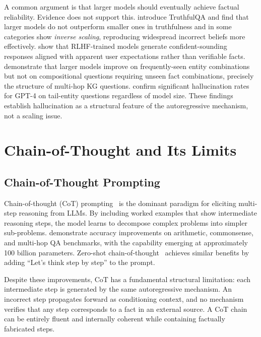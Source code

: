 A common argument is that larger models should eventually achieve factual reliability. Evidence does not support this. \citet{lin2022truthfulqa} introduce TruthfulQA and find that larger models do not outperform smaller ones in truthfulness and in some categories show \textit{inverse scaling}, reproducing widespread incorrect beliefs more effectively. \citet{perez2022sycophancy} show that RLHF-trained models generate confident-sounding responses aligned with apparent user expectations rather than verifiable facts. \citet{kandpal2023large} demonstrate that larger models improve on frequently-seen entity combinations but not on compositional questions requiring unseen fact combinations, precisely the structure of multi-hop KG questions. \citet{mallen2023not} confirm significant hallucination rates for GPT-4 on tail-entity questions regardless of model size. These findings establish hallucination as a structural feature of the autoregressive mechanism, not a scaling issue.

\section{Chain-of-Thought and Its Limits}
\label{sec:cot}

\subsection{Chain-of-Thought Prompting}

Chain-of-thought (CoT) prompting~\citep{wei2022cot} is the dominant paradigm for eliciting multi-step reasoning from LLMs. By including worked examples that show intermediate reasoning steps, the model learns to decompose complex problems into simpler sub-problems. \citet{wei2022cot} demonstrate accuracy improvements on arithmetic, commonsense, and multi-hop QA benchmarks, with the capability emerging at approximately 100 billion parameters. Zero-shot chain-of-thought~\citep{kojima2022zero} achieves similar benefits by adding ``Let's think step by step'' to the prompt.

Despite these improvements, CoT has a fundamental structural limitation: each intermediate step is generated by the same autoregressive mechanism. An incorrect step propagates forward as conditioning context, and no mechanism verifies that any step corresponds to a fact in an external source. A CoT chain can be entirely fluent and internally coherent while containing factually fabricated steps.

